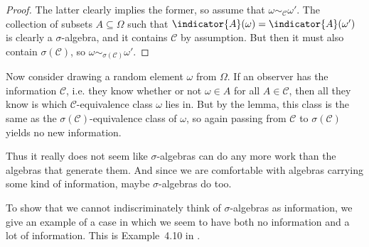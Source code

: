 \documentclass[article, a4paper, 11pt, oneside]{memoir}
\numberwithin{equation}{chapter}
\newcommand{\calC}{\mathcal{C}}
\begin{document}
\begin{proof}
    The latter clearly implies the former, so assume that $\omega \sim_\calC \omega'$. The collection of subsets $A \subseteq \Omega$ such that $\indicator{A}(\omega) = \indicator{A}(\omega')$ is clearly a $\sigma$-algebra, and it contains $\calC$ by assumption. But then it must also contain $\sigma(\calC)$, so $\omega \sim_{\sigma(\calC)} \omega'$.
\end{proof}
%
Now consider drawing a random element $\omega$ from $\Omega$. If an observer has the information $\calC$, i.e. they know whether or not $\omega \in A$ for all $A \in \calC$, then all they know is which $\calC$-equivalence class $\omega$ lies in. But by the lemma, this class is the same as the $\sigma(\calC)$-equivalence class of $\omega$, so again passing from $\calC$ to $\sigma(\calC)$ yields no new information.


Thus it really does not seem like $\sigma$-algebras can do any more work than the algebras that generate them. And since we are comfortable with algebras carrying some kind of information, maybe $\sigma$-algebras do too.

To show that we cannot indiscriminately think of $\sigma$-algebras as information, we give an example of a case in which we seem to have both no information and a lot of information. This is Example~4.10 in \textcite{billingsley1995}.
\end{document}
